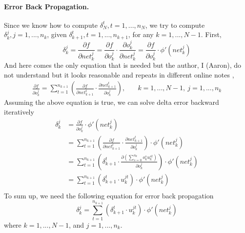 \paragraph{Error Back Propagation.}
Since we know how to compute $\delta_N^t, t = 1,...,n_N$, we try to compute $\delta_{k}^j, j = 1,...,n_{k}$, given $\delta_{k+1}^t, t = 1,...,n_{k+1}$, for any $k = 1,...,N-1$.
First,
\[
    \delta_{k}^j
    = \frac{\partial f}{\partial \mathit{net}_{k}^j}
    = \frac{\partial f}{\partial o_{k}^j} \cdot \frac{\partial o_{k}^j}{\partial \mathit{net}_{k}^j}
    = \frac{\partial f}{\partial o_{k}^j} \cdot \phi'(\mathit{net}_{k}^j)
\]
And here comes the only equation that is needed but the author, I (Aaron), do not understand but it looks reasonable and repeats in different online notes \cite{mlp_gradient_wisc},
\[\begin{alignedat}{5}
    \frac{\partial f}{\partial o_{k}^j} = \sum_{t=1}^{n_{k+1}} \left( \frac{\partial f}{\partial \mathit{net}_{k+1}^t} \cdot \frac{\partial \mathit{net}_{k+1}^t}{\partial o_{k}^j} \right),
    &\quad k = 1,...,N-1, \: j = 1,...,n_{k}
\end{alignedat}\]
Assuming the above equation is true, we can solve delta error backward iteratively
\[\begin{aligned}
    \delta_{k}^j
    &= \frac{\partial f}{\partial o_{k}^j} \cdot \phi'(\mathit{net}_{k}^j) \\
    &= \sum_{t=1}^{n_{k+1}} \left( \frac{\partial f}{\partial \mathit{net}_{k+1}^t} \cdot \frac{\partial \mathit{net}_{k+1}^t}{\partial o_{k}^j} \right) \cdot \phi'(\mathit{net}_{k}^j) \\
    &= \sum_{t=1}^{n_{k+1}} \left( \delta_{k+1}^t \cdot \frac{\partial \left( \sum_{s=0}^{n_{k}} o_{k}^s u_{k}^{st} \right) }{\partial o_{k}^j} \right) \cdot \phi'(\mathit{net}_{k}^j) \\
    &= \sum_{t=1}^{n_{k+1}} \left( \delta_{k+1}^t \cdot u_{k}^{jt} \right) \cdot \phi'(\mathit{net}_{k}^j) \\
\end{aligned}\]
To sum up, we need the following equation for error back propagation
\[\boxed{\delta_{k}^j = \sum_{t=1}^{n_{k+1}} \left( \delta_{k+1}^t \cdot u_{k}^{jt} \right) \cdot \phi'(\mathit{net}_{k}^j)}\]
where $k = 1,...,N-1$, and $j = 1,...,n_{k}$.

